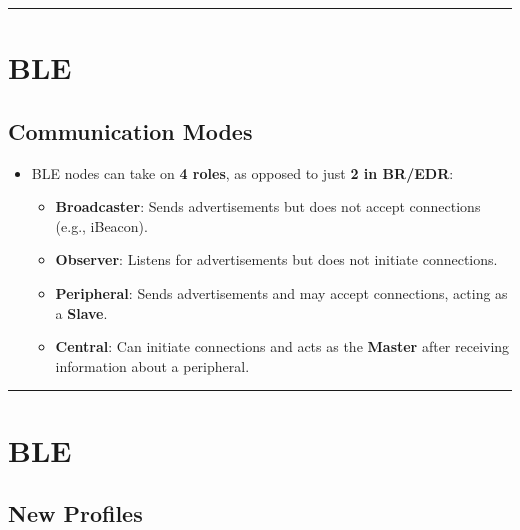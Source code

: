 \documentclass[a4paper, 12pt]{book} %
\begin{document}
\begin{center}\rule{0.5\linewidth}{0.5pt}\end{center}

\section{BLE}\label{ble-1}

\subsection{Communication Modes}\label{communication-modes}

\begin{itemize}
\tightlist
\item
  BLE nodes can take on \textbf{4 roles}, as opposed to just \textbf{2
  in BR/EDR}:

  \begin{itemize}
  \tightlist
  \item
    \textbf{Broadcaster}: Sends advertisements but does not accept
    connections (e.g., iBeacon).
  \item
    \textbf{Observer}: Listens for advertisements but does not initiate
    connections.
  \item
    \textbf{Peripheral}: Sends advertisements and may accept
    connections, acting as a \textbf{Slave}.
  \item
    \textbf{Central}: Can initiate connections and acts as the
    \textbf{Master} after receiving information about a peripheral.
  \end{itemize}
\end{itemize}

\begin{center}\rule{0.5\linewidth}{0.5pt}\end{center}

\section{BLE}\label{ble-2}

\subsection{New Profiles}\label{new-profiles}
\end{document}

